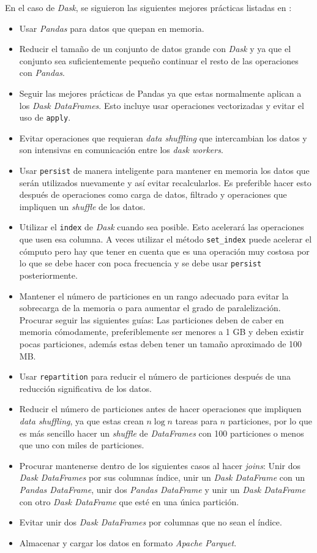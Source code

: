 En el caso de \textit{Dask}, se siguieron las siguientes mejores prácticas listadas en \cite{daskbestpractices}:
\begin{itemize}
	\item Usar \textit{Pandas} para datos que quepan en memoria.
	\item Reducir el tamaño de un conjunto de datos grande con \textit{Dask} y ya que el conjunto sea suficientemente pequeño continuar el resto de las operaciones con \textit{Pandas}.
	\item Seguir las mejores prácticas de Pandas ya que estas normalmente aplican a los \textit{Dask DataFrames}. Esto incluye usar operaciones vectorizadas y evitar el uso de \texttt{apply}.
	\item Evitar operaciones que requieran \textit{data shuffling} que intercambian los datos y son intensivas en comunicación entre los \textit{dask workers}. 
	\item Usar \texttt{persist} de manera inteligente para mantener en memoria los datos que serán utilizados nuevamente y así evitar recalcularlos. Es preferible hacer esto después de operaciones como carga de datos, filtrado y operaciones que impliquen un \textit{shuffle} de los datos.
	\item Utilizar el \texttt{index} de \textit{Dask} cuando sea posible. Esto acelerará las operaciones que usen esa columna. A veces utilizar el método \texttt{set\_index} puede acelerar el cómputo pero hay que tener en cuenta que es una operación muy costosa por lo que se debe hacer con poca frecuencia y se debe usar \texttt{persist} posteriormente.
	\item Mantener el número de particiones en un rango adecuado para evitar la sobrecarga de la memoria o para aumentar el grado de paralelización. Procurar seguir las siguientes guías: Las particiones deben de caber en memoria cómodamente, preferiblemente ser menores a 1 GB y deben existir pocas particiones, además estas deben tener un tamaño aproximado de 100 MB. 
	\item Usar \texttt{repartition} para reducir el número de particiones después de una reducción significativa de los datos.
	\item Reducir el número de particiones antes de hacer operaciones que impliquen \textit{data shuffling}, ya que estas crean $n \log{n}$ tareas para $n$ particiones, por lo que es más sencillo hacer un \textit{shuffle} de \textit{DataFrames} con 100 particiones o menos que uno con miles de particiones.
	\item Procurar mantenerse dentro de los siguientes casos al hacer \textit{joins}: Unir dos \textit{Dask DataFrames} por sus columnas índice, unir un \textit{Dask DataFrame} con un \textit{Pandas DataFrame}, unir dos \textit{Pandas DataFrame} y unir un \textit{Dask DataFrame} con otro \textit{Dask DataFrame} que esté en una única partición. 
	\item Evitar unir dos \textit{Dask DataFrames} por columnas que no sean el índice.
	\item Almacenar y cargar los datos en formato \textit{Apache Parquet}.
\end{itemize}

